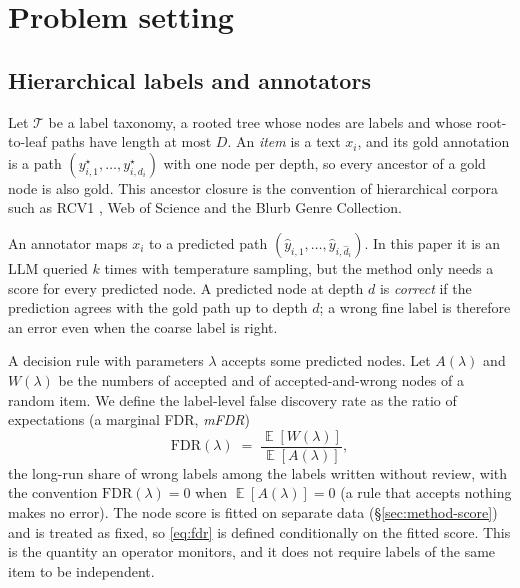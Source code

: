 \documentclass[preprint,12pt]{elsarticle}
\theoremstyle{definition}
\theoremstyle{remark}
\newcommand{\fdr}{\mathrm{FDR}}
\DeclareMathOperator{\E}{\mathbb{E}}
\begin{document}
\section{Problem setting}
\label{sec:setting}

\subsection{Hierarchical labels and annotators}

Let $\mathcal{T}$ be a label taxonomy, a rooted tree whose nodes are labels and
whose root-to-leaf paths have length at most $D$. An \emph{item} is a text
$x_i$, and its gold annotation is a path $(y^\star_{i,1},\dots,y^\star_{i,d_i})$
with one node per depth, so every ancestor of a gold node is also gold. This
ancestor closure is the convention of hierarchical corpora such as RCV1
\cite{lewis2004rcv1}, Web of Science and the Blurb Genre Collection.

An annotator maps $x_i$ to a predicted path
$(\hat y_{i,1},\dots,\hat y_{i,\hat d_i})$. In this paper it is an LLM queried
$k$ times with temperature sampling, but the method only needs a score for every
predicted node. A predicted node at depth $d$ is \emph{correct} if the
prediction agrees with the gold path up to depth $d$; a wrong fine label is
therefore an error even when the coarse label is right.

A decision rule with parameters $\lambda$ accepts some predicted nodes. Let
$A(\lambda)$ and $W(\lambda)$ be the numbers of accepted and of accepted-and-wrong
nodes of a random item. We define the label-level false discovery rate as the
ratio of expectations (a marginal FDR, \emph{mFDR})
\begin{equation}
  \fdr(\lambda) \;=\; \frac{\E[W(\lambda)]}{\E[A(\lambda)]},
  \label{eq:fdr}
\end{equation}
the long-run share of wrong labels among the labels written without review,
with the convention $\fdr(\lambda)=0$ when $\E[A(\lambda)]=0$ (a rule that
accepts nothing makes no error). The node score is fitted on separate data
(\S\ref{sec:method-score}) and is treated as fixed, so \eqref{eq:fdr} is
defined conditionally on the fitted score. This is the quantity an operator
monitors, and it does not require labels of the same item to be independent.
\end{document}
